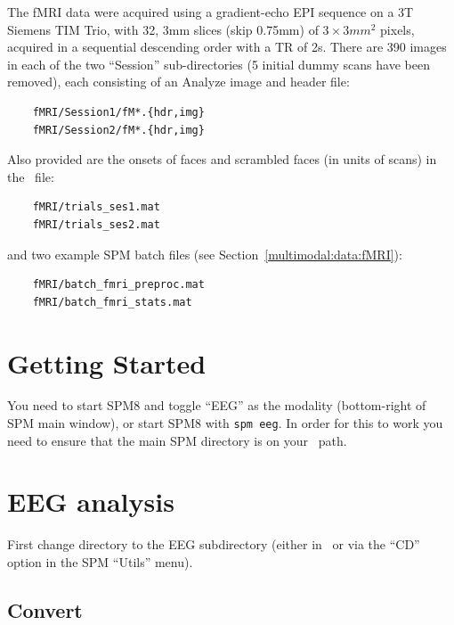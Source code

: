 The fMRI data were acquired using a gradient-echo EPI sequence on a 3T Siemens TIM Trio, with 32, 3mm slices (skip 0.75mm) of $3\times 3 mm^2$ pixels, acquired in a sequential descending order with a TR of 2s. There are 390 images in each of the two ``Session'' sub-directories (5 initial dummy scans have been removed), each consisting of an Analyze image and header file:
\begin{verbatim}
    fMRI/Session1/fM*.{hdr,img}
    fMRI/Session2/fM*.{hdr,img}
\end{verbatim}
Also provided are the onsets of faces and scrambled faces (in units of scans) in the \matlab\ file:
\begin{verbatim}
    fMRI/trials_ses1.mat
    fMRI/trials_ses2.mat
\end{verbatim}
and two example SPM batch files (see Section~\ref{multimodal:data:fMRI}):
\begin{verbatim}
    fMRI/batch_fmri_preproc.mat
    fMRI/batch_fmri_stats.mat
\end{verbatim}


\section{Getting Started}

You need to start SPM8 and toggle ``EEG'' as the modality (bottom-right of SPM main window), or start SPM8 with \texttt{spm eeg}. In order for this to work you need to ensure that the main SPM directory is on your \matlab\ path.

\section{EEG analysis}

First change directory to the EEG subdirectory (either in \matlab\, or via the ``CD'' option in the SPM ``Utils'' menu).

\subsection{Convert}

